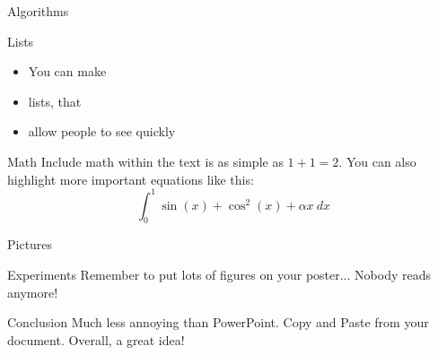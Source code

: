 \documentclass[serif,mathserif,final]{beamer}
\begin{document}
\begin{frame}{}
\begin{columns}[t]
\begin{column}{0.49\linewidth}
\begin{block}{\Huge Algorithms}
      \end{block}

      \begin{block}{Lists}
        \begin{itemize}
          \item You can make
          \item lists, that
          \item allow people to see quickly
        \end{itemize}
      \end{block}

      \begin{block}{Math}
        Include math within the text is as simple as $1+1=2$.  You can also
        highlight more important equations like this:
        \begin{equation*}
          \int_0^1\sin(x)+\cos^2(x)+\alpha x~d\!x
        \end{equation*}
      \end{block}


      \begin{block}{Pictures}
        \begin{figure}[htb]
          \centering
        \end{figure}
      \end{block}

      \begin{block}{Experiments}
        Remember to put lots of figures on your poster... Nobody reads anymore!
      \end{block}

      \begin{block}{Conclusion}
        Much less annoying than PowerPoint.  Copy and Paste from your
        document. Overall, a great idea!
      \end{block}

    \end{column}%

% 

  \end{columns}
\end{frame}
\end{document}
